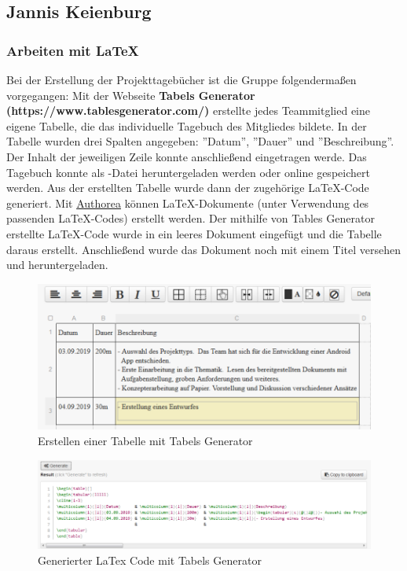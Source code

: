 \clearpage

\subsection{Jannis Keienburg}

\subsubsection{Arbeiten mit \LaTeX}

Bei der Erstellung der Projekttagebücher ist die Gruppe folgendermaßen vorgegangen: 
Mit der Webseite \textbf{Tabels Generator (https://www.tablesgenerator.com/)} erstellte jedes Teammitglied eine eigene Tabelle, die das individuelle Tagebuch des Mitgliedes bildete. In der Tabelle wurden drei Spalten angegeben: ''Datum'', ''Dauer'' und ''Beschreibung''. Der Inhalt der jeweiligen Zeile konnte anschließend eingetragen werde. Das Tagebuch konnte als -Datei heruntergeladen werden oder online gespeichert werden. Aus der erstellten Tabelle wurde dann der zugehörige \LaTeX-Code generiert. Mit \hyperlink{www.authorea.com}{Authorea} können LaTeX-Dokumente (unter Verwendung des passenden \LaTeX-Codes) erstellt werden. Der mithilfe von Tables Generator erstellte \LaTeX-Code wurde in ein leeres Dokument eingefügt und die Tabelle daraus erstellt. Anschließend wurde das Dokument noch mit einem Titel versehen und heruntergeladen.  

\begin{figure}[!h]
	\includegraphics[scale=1]{img/tabels-generator-erstellen}
	\caption[Erstellen einer Tabelle mit Tabels Generator]{Erstellen einer Tabelle mit Tabels Generator\footnotemark}
\end{figure}
\FloatBarrier

\begin{figure}[!h]
	\includegraphics[scale=1]{img/tables-generator-generate}
	\caption[Generierter LaTex Code mit Tabels Generator]{Generierter LaTex Code mit Tabels Generator\footnotemark}
\end{figure}
\FloatBarrier

